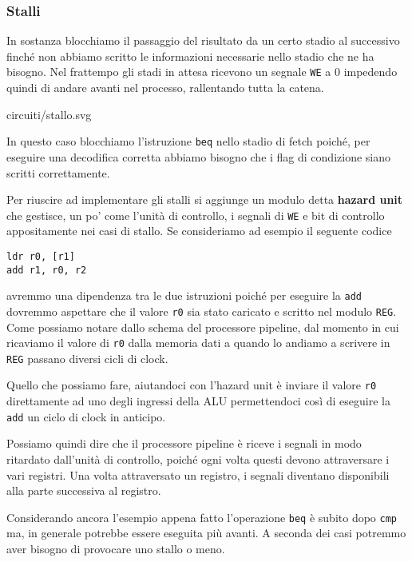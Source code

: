 \subsubsection{Stalli}
In sostanza blocchiamo il passaggio del risultato da un certo stadio al successivo finché non
abbiamo scritto le informazioni necessarie nello stadio che ne ha bisogno. Nel frattempo gli stadi
in attesa ricevono un segnale \verb|WE| a 0 impedendo quindi di andare avanti nel processo,
rallentando tutta la catena.
\begin{center}
	 {circuiti/stallo.svg}
\end{center}
In questo caso blocchiamo l'istruzione \verb|beq| nello stadio di fetch poiché, per eseguire una
decodifica corretta abbiamo bisogno che i flag di condizione siano scritti correttamente.

Per riuscire ad implementare gli stalli si aggiunge un modulo detta \textbf{hazard unit} che
gestisce, un po' come l'unità di controllo, i segnali di \verb|WE| e bit di controllo appositamente
nei casi di stallo. Se consideriamo ad esempio il seguente codice
\begin{verbatim}
ldr r0, [r1]
add r1, r0, r2
\end{verbatim}
avremmo una dipendenza tra le due istruzioni poiché per eseguire la \verb|add| dovremmo aspettare
che il valore \verb|r0| sia stato caricato e scritto nel modulo \verb|REG|. Come possiamo notare
dallo schema del processore pipeline, dal momento in cui ricaviamo il valore di \verb|r0| dalla
memoria dati a quando lo andiamo a scrivere in \verb|REG| passano diversi cicli di clock.

Quello che possiamo fare, aiutandoci con l'hazard unit è inviare il valore \verb|r0| direttamente
ad uno degli ingressi della ALU permettendoci così di eseguire la \verb|add| un ciclo di clock in
anticipo.

\begin{tcolorbox}
	Possiamo quindi dire che il processore pipeline è riceve i segnali in modo ritardato dall'unità
	di controllo, poiché ogni volta questi devono attraversare i vari registri. Una volta
	attraversato un registro, i segnali diventano disponibili alla parte successiva al registro.
\end{tcolorbox}

Considerando ancora l'esempio appena fatto l'operazione \verb|beq| è subito dopo \verb|cmp| ma, in
generale potrebbe essere eseguita più avanti. A seconda dei casi potremmo aver bisogno di provocare
uno stallo o meno.

